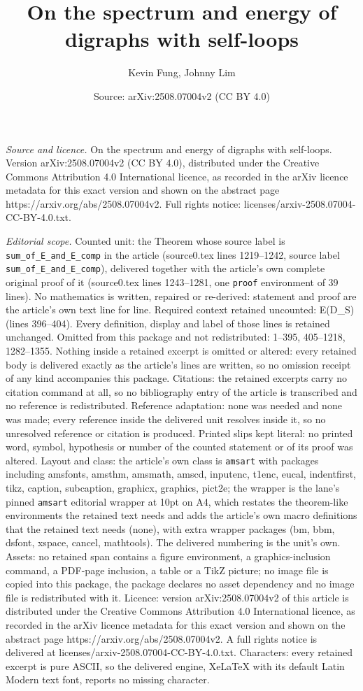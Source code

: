 \documentclass[10pt,a4paper]{amsart}
\title[On the spectrum and energy of digraphs with self-loops]{On the spectrum and energy of digraphs with self-loops}
\author{Kevin Fung, Johnny Lim}
\date{Source: arXiv:2508.07004v2 (CC BY 4.0)}
\begin{document}
\maketitle

\noindent\emph{Source and licence.} On the spectrum and energy of digraphs with self-loops. Version arXiv:2508.07004v2 (CC BY 4.0), distributed under the Creative Commons Attribution 4.0 International licence, as recorded in the arXiv licence metadata for this exact version and shown on the abstract page https://arxiv.org/abs/2508.07004v2. Full rights notice: licenses/arxiv-2508.07004-CC-BY-4.0.txt.\par\smallskip

\noindent\textit{Editorial scope.} Counted unit: the Theorem whose source label is \texttt{sum\_of\_E\_and\_E\_comp} in the article (source0.tex lines 1219--1242, source label \texttt{sum\_of\_E\_and\_E\_comp}), delivered together with the article's own complete original proof of it (source0.tex lines 1243--1281, one \texttt{proof} environment of 39 lines). No mathematics is written, repaired or re-derived: statement and proof are the article's own text line for line. Required context retained uncounted: E(D\_S) (lines 396--404). Every definition, display and label of those lines is retained unchanged. Omitted from this package and not redistributed: 1--395, 405--1218, 1282--1355. Nothing inside a retained excerpt is omitted or altered: every retained body is delivered exactly as the article's lines are written, so no omission receipt of any kind accompanies this package. Citations: the retained excerpts carry no citation command at all, so no bibliography entry of the article is transcribed and no reference is redistributed. Reference adaptation: none was needed and none was made; every reference inside the delivered unit resolves inside it, so no unresolved reference or citation is produced. Printed slips kept literal: no printed word, symbol, hypothesis or number of the counted statement or of its proof was altered. Layout and class: the article's own class is \texttt{amsart} with packages including amsfonts, amsthm, amsmath, amscd, inputenc, t1enc, eucal, indentfirst, tikz, caption, subcaption, graphicx, graphics, pict2e; the wrapper is the lane's pinned \texttt{amsart} editorial wrapper at 10pt on A4, which restates the theorem-like environments the retained text needs and adds the article's own macro definitions that the retained text needs (none), with extra wrapper packages (bm, bbm, dsfont, xspace, cancel, mathtools). The delivered numbering is the unit's own. Assets: no retained span contains a figure environment, a graphics-inclusion command, a PDF-page inclusion, a table or a TikZ picture; no image file is copied into this package, the package declares no asset dependency and no image file is redistributed with it. Licence: version arXiv:2508.07004v2 of this article is distributed under the Creative Commons Attribution 4.0 International licence, as recorded in the arXiv licence metadata for this exact version and shown on the abstract page https://arxiv.org/abs/2508.07004v2. A full rights notice is delivered at licenses/arxiv-2508.07004-CC-BY-4.0.txt. Characters: every retained excerpt is pure ASCII, so the delivered engine, XeLaTeX with its default Latin Modern text font, reports no missing character.
\end{document}
